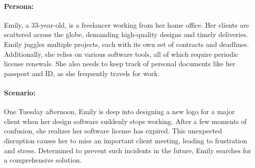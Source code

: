 \begin{minipage}[t]{0.65\textwidth} %
	\paragraph{Persona:\\}
	\vspace{0pt} %
	\noindent
	\vbox{
		\vspace{5pt}
		Emily, a 33-year-old, is a freelancer working from her home office. Her clients are scattered across the globe, demanding high-quality designs and timely deliveries. Emily juggles multiple projects, each with its own set of contracts and deadlines. Additionally, she relies on various software tools, all of which require periodic license renewals. She also needs to keep track of personal documents like her passport and ID, as she frequently travels for work.
	}
	\paragraph{Scenario:\\}
	\vspace{0pt} %
	\noindent
	\vbox{
		\vspace{5pt}
		One Tuesday afternoon, Emily is deep into designing a new logo for a major client when her design software suddenly stops working. After a few moments of confusion, she realizes her software license has expired. This unexpected disruption causes her to miss an important client meeting, leading to frustration and stress. Determined to prevent such incidents in the future, Emily searches for a comprehensive solution.
	}
\end{minipage}
\hfill
